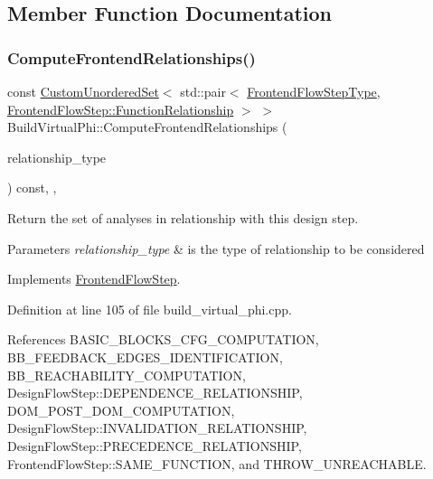 \subsection{Member Function Documentation}
\mbox{\label{classBuildVirtualPhi_ace3b2828aa2cef219d7e6a6d04132473}} 
\subsubsection{\texorpdfstring{Compute\+Frontend\+Relationships()}{ComputeFrontendRelationships()}}
{\footnotesize\ttfamily const \hyperlink{classCustomUnorderedSet}{Custom\+Unordered\+Set}$<$ std\+::pair$<$ \hyperlink{frontend__flow__step_8hpp_afeb3716c693d2b2e4ed3e6d04c3b63bb}{Frontend\+Flow\+Step\+Type}, \hyperlink{classFrontendFlowStep_af7cf30f2023e5b99e637dc2058289ab0}{Frontend\+Flow\+Step\+::\+Function\+Relationship} $>$ $>$ Build\+Virtual\+Phi\+::\+Compute\+Frontend\+Relationships (\begin{DoxyParamCaption}\item[{const \hyperlink{classDesignFlowStep_a723a3baf19ff2ceb77bc13e099d0b1b7}{Design\+Flow\+Step\+::\+Relationship\+Type}}]{relationship\+\_\+type }\end{DoxyParamCaption}) const\hspace{0.3cm}{\ttfamily [override]}, {\ttfamily [private]}, {\ttfamily [virtual]}}



Return the set of analyses in relationship with this design step. 


\begin{DoxyParams}{Parameters}
{\em relationship\+\_\+type} & is the type of relationship to be considered \\
\hline
\end{DoxyParams}


Implements \hyperlink{classFrontendFlowStep_abeaff70b59734e462d347ed343dd700d}{Frontend\+Flow\+Step}.



Definition at line 105 of file build\+\_\+virtual\+\_\+phi.\+cpp.



References B\+A\+S\+I\+C\+\_\+\+B\+L\+O\+C\+K\+S\+\_\+\+C\+F\+G\+\_\+\+C\+O\+M\+P\+U\+T\+A\+T\+I\+ON, B\+B\+\_\+\+F\+E\+E\+D\+B\+A\+C\+K\+\_\+\+E\+D\+G\+E\+S\+\_\+\+I\+D\+E\+N\+T\+I\+F\+I\+C\+A\+T\+I\+ON, B\+B\+\_\+\+R\+E\+A\+C\+H\+A\+B\+I\+L\+I\+T\+Y\+\_\+\+C\+O\+M\+P\+U\+T\+A\+T\+I\+ON, Design\+Flow\+Step\+::\+D\+E\+P\+E\+N\+D\+E\+N\+C\+E\+\_\+\+R\+E\+L\+A\+T\+I\+O\+N\+S\+H\+IP, D\+O\+M\+\_\+\+P\+O\+S\+T\+\_\+\+D\+O\+M\+\_\+\+C\+O\+M\+P\+U\+T\+A\+T\+I\+ON, Design\+Flow\+Step\+::\+I\+N\+V\+A\+L\+I\+D\+A\+T\+I\+O\+N\+\_\+\+R\+E\+L\+A\+T\+I\+O\+N\+S\+H\+IP, Design\+Flow\+Step\+::\+P\+R\+E\+C\+E\+D\+E\+N\+C\+E\+\_\+\+R\+E\+L\+A\+T\+I\+O\+N\+S\+H\+IP, Frontend\+Flow\+Step\+::\+S\+A\+M\+E\+\_\+\+F\+U\+N\+C\+T\+I\+ON, and T\+H\+R\+O\+W\+\_\+\+U\+N\+R\+E\+A\+C\+H\+A\+B\+LE.

